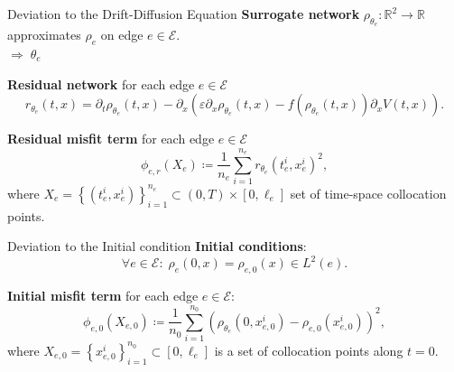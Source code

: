\documentclass[9pt]{beamer}
\begin{document}
\begin{frame}{Deviation to the Drift-Diffusion Equation}
    \textbf{Surrogate network} $\rho_{\theta_e} \colon \mathbb{R}^2 \to \mathbb{R}$ approximates $\rho_e$ on edge $e \in \mathcal{E}$. \\
    $\Rightarrow \; \theta_e$ \\

    \vspace{3mm}

    \textbf{Residual network} for each edge $e \in \mathcal{E}$
    \begin{equation*}
        r_{\theta_e} \left( t,x \right)=\partial_t \rho_{\theta_e} \left( t,x \right) - \partial_x   \left(  \varepsilon \partial_x  \rho_{\theta_e} \left( t,x \right) - f \left( \rho_{\theta_e} \left( t,x \right) \right) \partial_x V \left( t,x \right) \right).
    \end{equation*}

    \vspace{3mm}

    \textbf{Residual misfit term} for each edge $e \in \mathcal{E}$
    \begin{equation*} 
        \phi_{e,r}  \left( X_e \right) \coloneqq \frac{1}{n_e} \sum_{i=1}^{n_e} r_{\theta_e}  \left( t_e^i, x_e^i  \right)^2,
    \end{equation*} 
    where $X_e = \left\{ \left( t_e^i, x_e^i \right) \right\}_{i=1}^{n_e} \subset \left( 0, T \right) \times \left[0, \ell_e\right]$ set of time-space collocation points. \\
\end{frame}



\begin{frame}{Deviation to the Initial condition}
    \textbf{Initial conditions}:
    \begin{equation*}
        \forall e \in \mathcal{E} \colon \; \rho_e \left( 0,x \right)  = \rho_{e, 0} \left( x \right) \in L^2 \left( e \right).
    \end{equation*}

    \vspace{3mm}

    \textbf{Initial misfit term} for each edge $e \in \mathcal{E}$:
    \begin{equation*} 
        \phi_{e,0}  \left( X_{e,0} \right) \coloneqq \frac{1}{n_0} \sum_{i=1}^{n_0}  \left( \rho_{\theta_e}  \left( 0,x_{e,0}^i \right) - \rho_{e,0} \left( x_{e,0}^i \right) \right)^2, 
    \end{equation*} 
    where $X_{e,0} = \left\{ x_{e,0}^i \right\}_{i=1}^{n_0} \subset \left[0, \ell_e\right]$ is a set of collocation points along $t=0$.
\end{frame}
\end{document}

